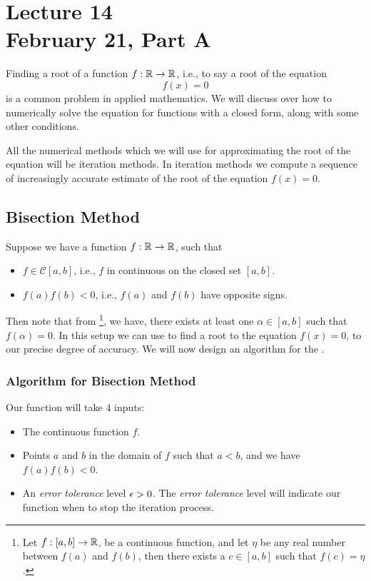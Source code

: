 \chapter*{Lecture 14 \\ February 21, Part A}
\setcounter{chapter}{14}
\setcounter{section}{0}

Finding a root of a function $f : \mathbb{R} \to \mathbb{R}$, i.e., to say a root of the equation 
\[
    f(x) = 0  
\]
is a common problem in applied mathematics. We will discuss over how to numerically solve the equation for functions with a closed form, along with some other conditions. 


All the numerical methods which we will use for approximating the root of the equation will be iteration methods. In iteration methods we compute a sequence of increasingly accurate estimate of the root of the equation $f(x) = 0$.

\section{Bisection Method}

Suppose we have a function $f : \mathbb{R} \to \mathbb{R}$, such that \begin{itemize}
    \item $f \in \mathcal{C}[a,b]$, i.e., $f$ in continuous on the closed set $[a,b]$. 
    \item $f(a)f(b) < 0$, i.e., $f(a)$ and $f(b)$ have opposite signs.  
\end{itemize}
Then note that from \footnote{ Let $f : [a,b] \to \mathbb{R}$, be a continuous function, and let $\eta$ be any real number between $f(a)$ and $f(b)$, then there exists a $c \in [a,b]$ such that $f(c) = \eta$.}, we have, there exists at least one $\alpha \in [a,b]$ such that $f(\alpha) = 0$. In this setup we can use  to find a root to the equation $f(x) = 0$, to our precise degree of accuracy. We will now design an algorithm for the .  

\subsection{Algorithm for Bisection Method}

Our function will take $4$ inputs: 
\begin{itemize}
    \item The continuous function $f$.
    \item Points $a$ and $b$ in the domain of $f$ such that $a < b$, and we have $f(a) f(b) < 0$.
    \item An \textit{error tolerance} level $\epsilon > 0$. The \textit{error tolerance} level will indicate our function when to stop the iteration process. 
\end{itemize}

